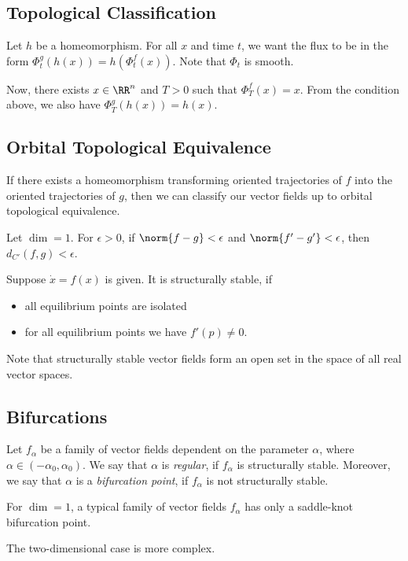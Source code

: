 \documentclass[11pt]{scrartcl}
\begin{document}
  \subsection{Topological Classification}

  Let $h$ be a homeomorphism. For all $x$ and time $t$, we want the
  flux to be in the form $\Phi_{t}^{g}(h(x)) = h(\Phi^{f}_{t}(x))$.
  Note that $\Phi_{t}$ is smooth.

  Now, there exists $x\in \RR^{n}$ and $T > 0$ such that
  $\Phi_{T}^{f}(x) = x$. From the condition above, we also have
  $\Phi_{T}^{g}(h(x)) = h(x)$.

  \subsection{Orbital Topological Equivalence}

  If there exists a homeomorphism transforming oriented trajectories
  of $f$ into the oriented trajectories of $g$, then we can classify
  our vector fields up to orbital topological equivalence.

  \begin{example}

    Let $\dim = 1$. For $\epsilon > 0$, if $\norm{f- g} < \epsilon$
    and $\norm{f' - g '} < \epsilon$, then $d_{C'}(f, g) < \epsilon$.

  \end{example}

  \begin{theorem}
    Suppose $\dot{x} = f(x)$ is given. It is structurally stable, if
    \begin{itemize}
    \item all equilibrium points are isolated
    \item for all equilibrium points we have $f'(p) \neq 0$.
    \end{itemize}
  \end{theorem}

  \begin{note*}
    Note that structurally stable vector fields form an open set in
    the space of all real vector spaces.
  \end{note*}

  \subsection{Bifurcations}

  Let $f_{\alpha}$ be a family of vector fields dependent on the
  parameter $\alpha$, where $\alpha \in (- \alpha_{0}, \alpha_{0})$.
  We say that $\alpha$ is \textit{regular}, if $f_{\alpha}$ is structurally
  stable. Moreover, we say that $\alpha$ is a \textit{bifurcation point}, if
  $f_{\alpha}$ is not structurally stable.

  \begin{theorem}
    For $\dim = 1$, a typical family of vector fields $f_{\alpha}$ has
    only a saddle-knot bifurcation point.
  \end{theorem}

  The two-dimensional case is more complex.

  
\end{document}
